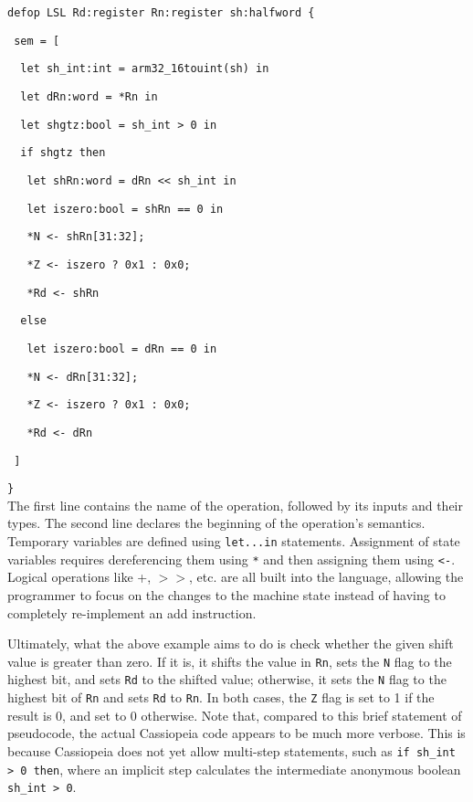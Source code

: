 \documentclass[letterpaper,12pt]{article}
\begin{document}
\texttt{defop LSL Rd:register Rn:register sh:halfword \{}

\texttt{\ sem = [}

\texttt{\ \ let sh\_int:int = arm32\_16touint(sh) in}

\texttt{\ \ let dRn:word = *Rn in}

\texttt{\ \ let shgtz:bool = sh\_int > 0 in}

\texttt{\ \ if shgtz then}

\texttt{\ \ \ let shRn:word = dRn << sh\_int in}

\texttt{\ \ \ let iszero:bool = shRn == 0 in}

\texttt{\ \ \ *N <- shRn[31:32];}

\texttt{\ \ \ *Z <- iszero ? 0x1 : 0x0;}

\texttt{\ \ \ *Rd <- shRn}

\texttt{\ \ else}

\texttt{\ \ \ let iszero:bool = dRn == 0 in}

\texttt{\ \ \ *N <- dRn[31:32];}

\texttt{\ \ \ *Z <- iszero ? 0x1 : 0x0;}

\texttt{\ \ \ *Rd <- dRn}

\texttt{\ ]}

\texttt{\}}\\

The first line contains the name of the operation, followed by its inputs and their types. The second line declares the beginning of the operation's semantics. Temporary variables are defined using \texttt{let...in} statements. Assignment of state variables requires dereferencing them using \texttt{*} and then assigning them using \texttt{<-}. Logical operations like +, $>>$, etc. are all built into the language, allowing the programmer to focus on the changes to the machine state instead of having to completely re-implement an add instruction.

Ultimately, what the above example aims to do is check whether the given shift value is greater than zero. If it is, it shifts the value in \texttt{Rn}, sets the \texttt{N} flag to the highest bit, and sets \texttt{Rd} to the shifted value; otherwise, it sets the \texttt{N} flag to the highest bit of \texttt{Rn} and sets \texttt{Rd} to \texttt{Rn}. In both cases, the \texttt{Z} flag is set to 1 if the result is 0, and set to 0 otherwise. Note that, compared to this brief statement of pseudocode, the actual Cassiopeia code appears to be much more verbose. This is because Cassiopeia does not yet allow multi-step statements, such as \texttt{if sh\_int > 0 then}, where an implicit step calculates the intermediate anonymous boolean \texttt{sh\_int > 0}.
\end{document}
